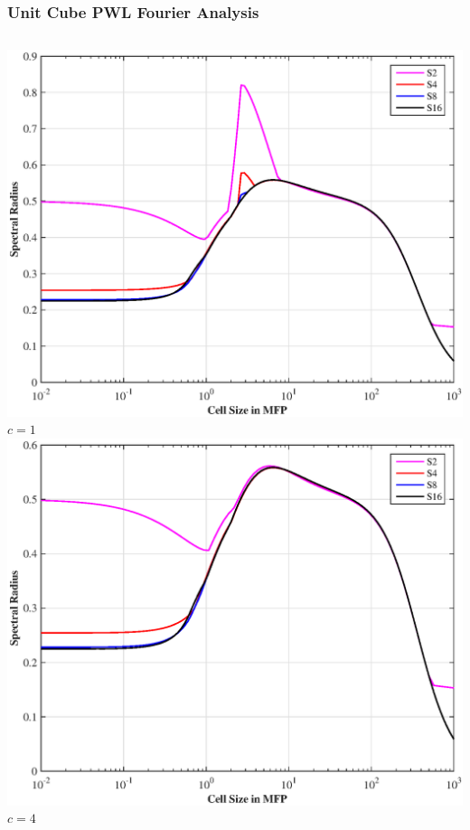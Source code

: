 \documentclass[compress,10pt]{beamer}
\begin{document}
\begin{frame}[t]
{
\frametitle{Unit Cube PWL Fourier Analysis}
\vspace{1cm}
\begin{columns}
\centering
\includegraphics[width=\textwidth]{images/SI_MIP_hex_C=1_PWLD_LS.eps}\\
$c=1$
\centering
\includegraphics[width=\textwidth]{images/SI_MIP_hex_C=4_PWLD_LS.eps}\\
$c=4$
\end{columns}
}
\end{frame}
\end{document}
